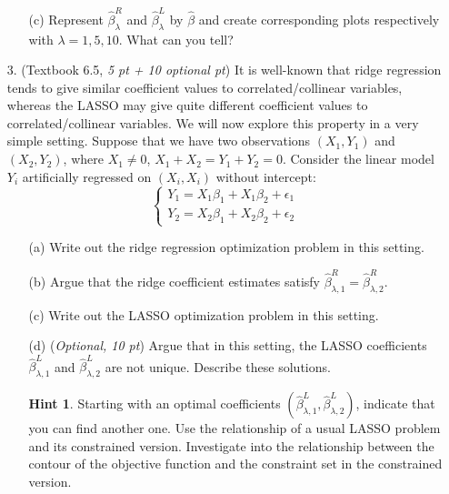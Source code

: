 \documentclass[10pt]{article}
\theoremstyle{definition}
\newtheorem*{hint}{Hint}
\theoremstyle{remark}
\begin{document}
\begin{itemize}
\begin{itemize}
		\item [(c)] Represent $ \hat{\beta}^{R}_{\lambda} $ and $ \hat{\beta}^{L}_{\lambda} $ by $ \hat{\beta}$ and create corresponding plots respectively with $ \lambda = 1,5,10 $. What can you tell?
	\end{itemize}

	\item [3.] (Textbook 6.5, \textit{5 pt + 10 optional pt}) It is well-known that ridge regression tends to give similar coefficient values to correlated/collinear variables, whereas the LASSO may give quite different coefficient values to correlated/collinear variables. We will now explore this property in a very simple setting. Suppose that we have two observations $ (X_{1},Y_{1}) $ and $ (X_{2},Y_{2}) $, where $ X_{1} \ne 0 $, $ X_{1} + X_{2} = Y_{1} + Y_{2} = 0 $. Consider the linear model $ Y_{i} $ artificially regressed on $ (X_{i},X_{i}) $ without intercept:
	\[ \begin{cases}
	Y_{1} = X_{1}\beta_{1} + X_{1}\beta_{2} + \epsilon_{1}\\
	Y_{2} = X_{2}\beta_{1} + X_{2}\beta_{2} + \epsilon_{2}
	\end{cases} \]
	\begin{itemize}
		\item [(a)] Write out the ridge regression optimization problem in this setting. 
		
		\item [(b)] Argue that the ridge coefficient estimates satisfy $ \hat{\beta}^{R}_{\lambda,1} = \hat{\beta}^{R}_{\lambda,2} $.
		
		\item [(c)] Write out the LASSO optimization problem in this setting.
		
		\item [(d)] (\textit{Optional, 10 pt}) Argue that in this setting, the LASSO coefficients $ \hat{\beta}_{\lambda,1}^{L} $ and $ \hat{\beta}^{L}_{\lambda,2} $ are not unique. Describe these solutions.
		\begin{hint}
			Starting with an optimal coefficients $ (\hat{\beta}_{\lambda,1}^{L},\hat{\beta}_{\lambda,2}^{L}) $, indicate that you can find another one. Use the relationship of a usual LASSO problem and its constrained version. Investigate into the relationship between the contour of the objective function and the constraint set in the constrained version.
		\end{hint}
	\end{itemize}

\end{itemize}
	
\end{document}
